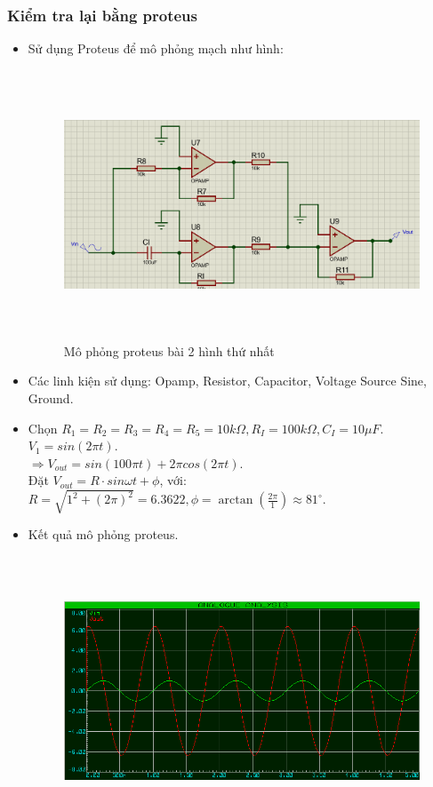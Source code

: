         \subsubsection{Kiểm tra lại bằng proteus}
            \begin{itemize}
                \item Sử dụng Proteus để mô phỏng mạch như hình: 
                \begin{figure}[H]
                    \centering
                    \includegraphics[width=120mm, height=80mm]{pictures/result2_a_1.png}
                    \caption{Mô phỏng proteus bài 2 hình thứ nhất}					
                \end{figure}
                \item Các linh kiện sử dụng: Opamp, Resistor, Capacitor, Voltage Source Sine, Ground.
                \item Chọn $R_{1} = R_{2} = R_{3} = R_{4} = R_{5} = 10k\Omega, R_{I} = 100k\Omega, C_{I} = 10\mu F$. $V_{1} = sin(2\pi t)$. \\
                $\Rightarrow V_{out} = sin(100\pi t) + 2\pi cos(2\pi t)$. \\
                Đặt $V_{out} = R \cdot sin{\omega t + \phi}$, với: $R = \sqrt{1^2 + (2\pi)^2} = 6.3622, \phi = \arctan(\frac{2\pi}{1}) \approx 81^\circ$.
                \item Kết quả mô phỏng proteus.
                \begin{figure}[H]
                    \centering
                    \includegraphics[width=120mm, height=80mm]{pictures/result2_a_2.png}

\end{figure}
\end{itemize}
